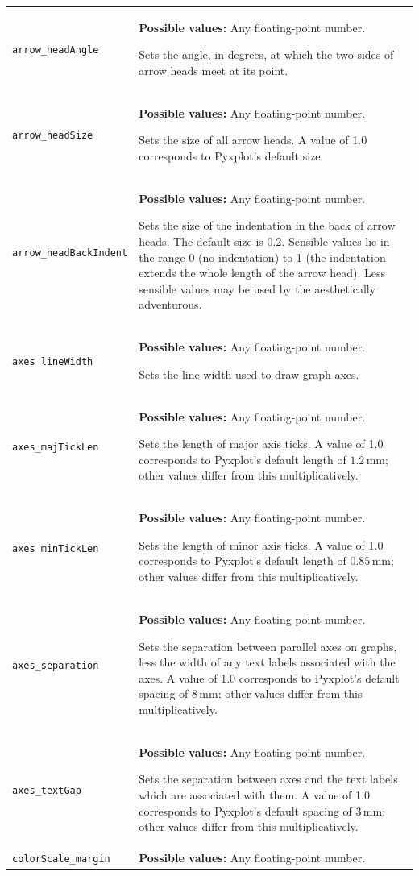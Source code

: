 \begin{longtable}{p{3.4cm}p{9cm}}
{\tt arrow\_headAngle} & {\bf Possible values:} Any floating-point number.

               Sets the angle, in degrees, at which the two sides of arrow heads meet at its point.
               \\
{\tt arrow\_headSize} & {\bf Possible values:} Any floating-point number.

               Sets the size of all arrow heads. A value of 1.0 corresponds to Pyxplot's default size.
               \\
{\tt arrow\_headBackIndent} & {\bf Possible values:} Any floating-point number.

               Sets the size of the indentation in the back of arrow heads. The default size is 0.2. Sensible values lie in the range 0 (no indentation) to 1 (the indentation extends the whole length of the arrow head). Less sensible values may be used by the aesthetically adventurous.
               \\
{\tt axes\_lineWidth}  & {\bf Possible values:} Any floating-point number.

               Sets the line width used to draw graph axes.
               \\
{\tt axes\_majTickLen} & {\bf Possible values:} Any floating-point number.

               Sets the length of major axis ticks. A value of 1.0 corresponds to Pyxplot's default length of $1.2\,\mathrm{mm}$; other values differ from this multiplicatively.
               \\
{\tt axes\_minTickLen} & {\bf Possible values:} Any floating-point number.

               Sets the length of minor axis ticks. A value of 1.0 corresponds to Pyxplot's default length of $0.85\,\mathrm{mm}$; other values differ from this multiplicatively.
               \\
{\tt axes\_separation} & {\bf Possible values:} Any floating-point number.

               Sets the separation between parallel axes on graphs, less the width of any text labels associated with the axes. A value of 1.0 corresponds to Pyxplot's default spacing of $8\,\mathrm{mm}$; other values differ from this multiplicatively.
               \\
{\tt axes\_textGap} & {\bf Possible values:} Any floating-point number.

               Sets the separation between axes and the text labels which are associated with them. A value of 1.0 corresponds to Pyxplot's default spacing of $3\,\mathrm{mm}$; other values differ from this multiplicatively.
               \\
{\tt colorScale\_margin} & {\bf Possible values:} Any floating-point number.


\end{longtable}
